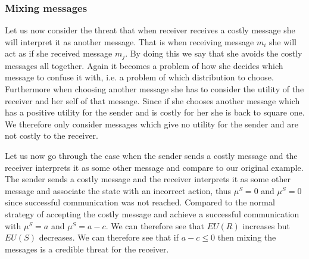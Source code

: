 \documentclass[10]{article}
\begin{document}
\subsubsection{Mixing messages}
Let us now consider the threat that when receiver receives a costly message she will interpret it as another message. %
That is when receiving message $m_i$ she will act as if she received message $m_j$. By doing this we say that she avoids the costly messages all together. Again it becomes a problem of how she decides which message to confuse it with, i.e. a problem of which distribution to choose. Furthermore when choosing another message she has to consider the utility of the receiver and her self of that message. Since if she chooses another message which has a positive utility for the sender and is costly for her she is back to square one. We therefore only consider messages which give no utility for the sender and are not costly to the receiver.

Let us now go through the case when the sender sends a costly message and the receiver interprets it as some other message and compare to our original example. The sender sends a costly message and the receiver interprets it as some other message and associate the state with an incorrect action, thus $\mu^S=0$ and $\mu^S=0$ since successful communication was not reached. Compared to the normal strategy of accepting the costly message and achieve a successful communication with $\mu^S=a$ and $\mu^S=a-c$. %
We can therefore see that $EU(R)$ increases but $EU(S)$ decreases. We can therefore see that if $a-c \leq 0$ then mixing the messages is a credible threat for the receiver.
\end{document}
